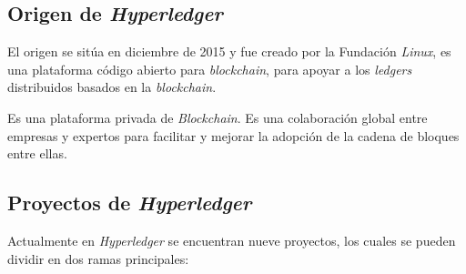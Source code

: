 \subsection{Origen de \textit{Hyperledger}}

El origen se sitúa en diciembre de 2015 y fue creado por la Fundación \textit{Linux}, es una plataforma código abierto para \textit{blockchain}, para apoyar a los \textit{ledgers} distribuidos basados en la \textit{blockchain}.

Es una plataforma privada de \textit{Blockchain}. Es una colaboración global entre empresas y expertos para facilitar y mejorar la adopción de la cadena de bloques entre ellas.

\subsection{Proyectos de \textit{Hyperledger}}

Actualmente en \textit{Hyperledger}\cite{hyperledger} se encuentran nueve proyectos, los cuales se pueden dividir en dos ramas principales: 


